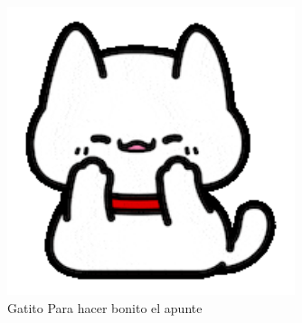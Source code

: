 \documentclass[12pt, letterpaper]{article}
\begin{document}
\begin{figure}[h!]
    \centering
    \includegraphics[width=0.75\textwidth]{Gat}
    \caption{Gatito Para hacer bonito el apunte}
    \label{fig:Gat}
\end{figure}


\newpage

\section{}
\end{document}
